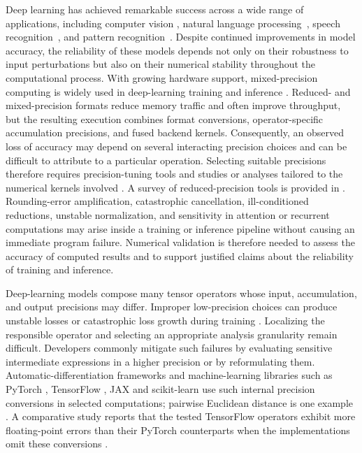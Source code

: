 \documentclass[manuscript, screen]{acmart}
\begin{document}
Deep learning has achieved remarkable success across a wide range of applications, including computer vision \cite{krizhevsky2012imagenet, he2016deep}, natural language processing~\cite{vaswani2017attention,devlin2019bert}, speech recognition~\cite{hinton2012deep,hannun2014deep}, and pattern recognition~\cite{lecun1998gradient,lecun2015deep}. Despite continued improvements in model accuracy, the reliability of these models depends not only on their robustness to input perturbations but also on their numerical stability throughout the computational process.
With growing hardware support, mixed-precision computing is widely used in deep-learning training and inference \cite{micikevicius2018mixed, ferro2022neural, ioualalen2019precision}. Reduced- and mixed-precision formats reduce memory traffic and often improve throughput, but the resulting execution combines format conversions, operator-specific accumulation precisions, and fused backend kernels. Consequently, an observed loss of accuracy may depend on several interacting precision choices and can be difficult to attribute to a particular operation. Selecting suitable precisions therefore requires precision-tuning tools and studies \cite{10387857, Ben2022, GRAILLAT2019101017, 10820739, chen2026} or analyses tailored to the numerical kernels involved \cite{doi:10.1137/17M1122918, doi:10.1137/18M1226312, car2024kmeans, arar2025mixedprecisionaccumulationneural}. A survey of reduced-precision tools is provided in \cite{10.1145/3381039}. Rounding-error amplification, catastrophic cancellation, ill-conditioned reductions, unstable normalization, and sensitivity in attention or recurrent computations may arise inside a training or inference pipeline without causing an immediate program failure. Numerical validation is therefore needed to assess the accuracy of computed results and to support justified claims about the reliability of training and inference.

Deep-learning models compose many tensor operators whose input, accumulation, and output precisions may differ. Improper low-precision choices can produce unstable losses or catastrophic loss growth during training \cite{qiu2026lowprecision, wortsman2023stable, lee2024fp8back, liu2026grokking}. Localizing the responsible operator and selecting an appropriate analysis granularity remain difficult. Developers commonly mitigate such failures by evaluating sensitive intermediate expressions in a higher precision or by reformulating them. Automatic-differentiation frameworks and machine-learning libraries such as PyTorch \cite{paszke2019pytorch}, TensorFlow \cite{abadi2016tensorflow}, JAX \citep{jax2018github} 
and scikit-learn \cite{scikit-learn} use such internal precision conversions in selected computations; pairwise Euclidean distance is one example \cite{car2024kmeans}. A comparative study reports that the tested TensorFlow operators exhibit more floating-point errors than their PyTorch counterparts when the implementations omit these conversions \cite{10.1145/3773992}.
\end{document}
